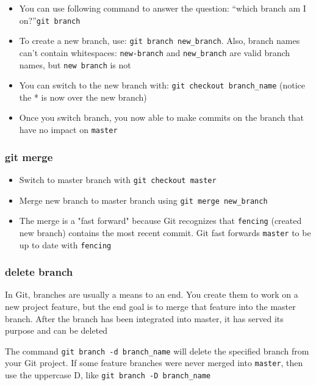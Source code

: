 \documentclass[a4paper, 12pt]{article}
\begin{document}
\begin{itemize}
\item You can use following command to answer the question: “which branch am I on?”\verb|git branch|

\item To create a new branch, use: \verb|git branch new_branch|. Also, branch names can't contain whitespaces: \verb|new-branch| and \verb|new_branch| are valid branch names, but \verb|new branch| is not

\item You can switch to the new branch with: \verb|git checkout branch_name| (notice the * is now over the new branch)

\item Once you switch branch, you now able to make commits on the branch that have no impact on \verb|master|

\end{itemize}

\subsubsection{git merge}
\begin{itemize}
\item Switch to master branch with \verb|git checkout master|

\item Merge new branch to master branch using \verb|git merge new_branch|

\item The merge is a "fast forward" because Git recognizes that \verb|fencing| (created new branch) contains the most recent commit. Git fast forwards \verb|master| to be up to date with \verb|fencing|

\end{itemize}

\subsubsection{delete branch}
In Git, branches are usually a means to an end. You create them to work on a new project feature, but the end goal is to merge that feature into the master branch. After the branch has been integrated into master, it has served its purpose and can be deleted

The command \verb|git branch -d branch_name| will delete the specified branch from your Git project. If some feature branches were never merged into \verb|master|, then use the uppercase D, like \verb|git branch -D branch_name|
\end{document}
